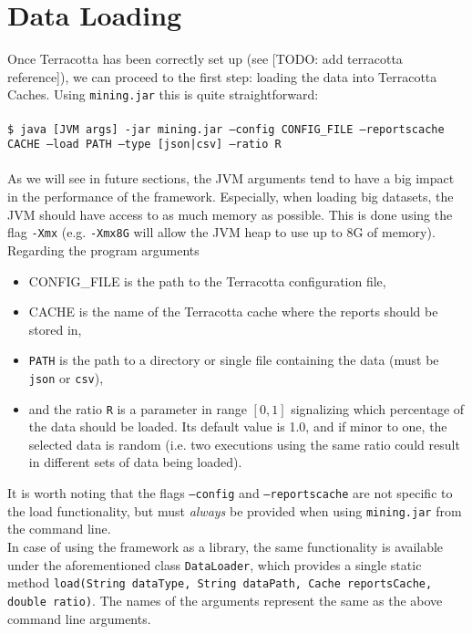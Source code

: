 \documentclass{article}
\begin{document}
	\section{Data Loading}
	\label{data loading}
		Once Terracotta has been correctly set up (see [TODO: add terracotta reference]), we can 
		proceed to the first step: loading the data into Terracotta Caches. Using \texttt{mining.jar} this
		is quite straightforward:\\ \\
		\texttt{\$ java [JVM args] -jar mining.jar --config CONFIG\_FILE --reportscache CACHE --load PATH --type [json|csv] --ratio R} \\ \\
		As we will see in future sections, the JVM arguments tend to have a big impact in the performance 
		of the framework. Especially, when loading big datasets, the JVM should have access to 
		as much memory as possible. This is done using the flag \texttt{-Xmx} (e.g. 
		\texttt{-Xmx8G} will allow the JVM heap to use up to 8G of memory).\\
		Regarding the program arguments
		\begin{itemize}
			\item CONFIG\_FILE is the path to the Terracotta configuration file,
			\item CACHE is the name of the Terracotta cache where the reports should be stored in,
			\item \texttt{PATH} is the path to a directory or single file containing the data 
				(must be \texttt{json} or \texttt{csv}),
			\item and the ratio \texttt{R} is a parameter in range $[0,1]$ signalizing which 
				percentage of the data should be loaded. Its default value is 1.0, and if minor to 
				one, the selected data is random (i.e. two executions using the same ratio could 
				result in different sets of data being loaded).
		\end{itemize} 
		It is worth noting that the flags \texttt{--config} and \texttt{--reportscache} are not 
		specific to the load functionality, but must \emph{always} be provided when using 
		\texttt{mining.jar} from the command line.\\
		In case of using the framework as a library, the same functionality is available under the 
		aforementioned class \texttt{DataLoader}, which provides a single static method
		\texttt{load(String dataType, String dataPath, Cache reportsCache, double ratio)}. The names
		of the arguments represent the same as the above command line arguments.\\
\end{document}

